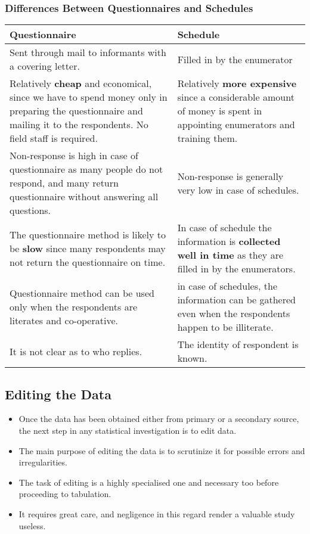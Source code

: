 \documentclass[
10pt, %
a4paper, %
]{report}
\begin{document}
\subsubsection*{Differences Between Questionnaires and Schedules}
\begin{center}
\centering
\begin{tabular}{| p{} | p{} |}
\hline
Questionnaire & Schedule \\
\hline \hline 
Sent through mail to informants with a covering letter. & Filled in by the enumerator \\
\hline
Relatively \textbf{cheap} and economical, since we have to spend money only in preparing the questionnaire and mailing it to the respondents. No field staff is required. & Relatively \textbf{more expensive} since a considerable amount of money is spent in appointing enumerators and training them. \\
\hline
Non-response is high in case of questionnaire as many people do not respond, and many return questionnaire without answering all questions. & Non-response is generally very low in case of schedules. \\
\hline
The questionnaire method is likely to be \textbf{slow} since many respondents may not return the questionnaire on time. &
In case of schedule the information is \textbf{collected well in time} as they are filled in by the enumerators. \\
\hline
Questionnaire method can be used only when the respondents are literates and co-operative. & in case of schedules, the information can be gathered even when the respondents happen to be illiterate. \\
\hline
It is not clear as to who replies. & The identity of respondent is known. \\
\hline
\end{tabular}
\end{center}

\subsection*{Editing the Data}
\begin{itemize}
\item Once the data has been obtained either from primary or a
secondary source, the next step in any statistical investigation
is to edit data.
\item The main purpose of editing the data is to scrutinize it for
possible errors and irregularities.
\item The task of editing is a highly specialised one and necessary
too before proceeding to tabulation.
\item It requires great care, and negligence in this regard render a valuable study useless.
\end{itemize}
\end{document}
